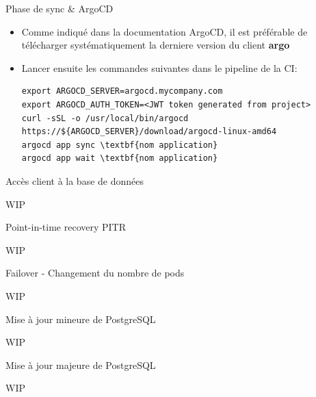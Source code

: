 \begin{frame}[fragile]{Phase de sync \& ArgoCD}

\begin{itemize}
   \item Comme indiqué dans la documentation ArgoCD, il est préférable de télécharger systématiquement la derniere version du client \textbf{argo}
   \item Lancer ensuite les commandes suivantes dans le pipeline de la CI:
\begin{tiny}
\begin{Verbatim}[commandchars=\\\{\}]
export ARGOCD_SERVER=argocd.mycompany.com
export ARGOCD_AUTH_TOKEN=<JWT token generated from project>
curl -sSL -o /usr/local/bin/argocd https://${ARGOCD_SERVER}/download/argocd-linux-amd64
argocd app sync \textbf{nom application}
argocd app wait \textbf{nom application}
\end{Verbatim}
\end{tiny}
\end{itemize}

\end{frame}


\begin{frame}[fragile]{Accès client à la base de données}

   WIP

\end{frame}


\begin{frame}[fragile]{Point-in-time recovery PITR}

   WIP

\end{frame}


\begin{frame}[fragile]{Failover - Changement du nombre de pods}

   WIP

\end{frame}


\begin{frame}[fragile]{Mise à jour mineure de PostgreSQL}

   WIP

\end{frame}


\begin{frame}[fragile]{Mise à jour majeure de PostgreSQL}

   WIP

\end{frame}

